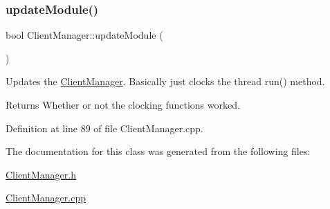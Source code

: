 \subsubsection{\texorpdfstring{update\+Module()}{updateModule()}}
{\footnotesize\ttfamily bool Client\+Manager\+::update\+Module (\begin{DoxyParamCaption}{ }\end{DoxyParamCaption})}

Updates the \hyperlink{classocra__recipes_1_1ClientManager}{Client\+Manager}. Basically just clocks the thread run() method. \begin{DoxyReturn}{Returns}
Whether or not the clocking functions worked. 
\end{DoxyReturn}


Definition at line 89 of file Client\+Manager.\+cpp.



The documentation for this class was generated from the following files\+:\begin{DoxyCompactItemize}
\item 
\hyperlink{ClientManager_8h}{Client\+Manager.\+h}\item 
\hyperlink{ClientManager_8cpp}{Client\+Manager.\+cpp}\end{DoxyCompactItemize}
